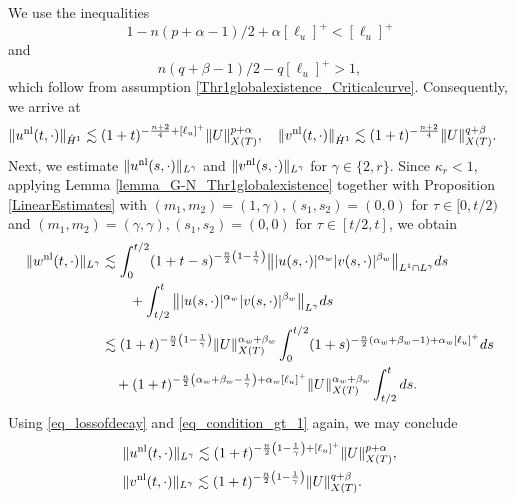\documentclass[11pt,reqno]{amsart}
\newcommand{\tron}[1]{\left(#1\right)}
\begin{document}
	We use the inequalities
	\begin{equation}\label{eq_lossofdecay}
		1-n(p+\alpha-1)/2+\alpha[\ell_u]^+<[\ell_u]^+
	\end{equation}
	and 
	\begin{equation}\label{eq_condition_gt_1}
		n(q+\beta-1)/2-q[\ell_u]^+>1,
	\end{equation}
	which follow from assumption \eqref{Thr1globalexistence_Criticalcurve}. Consequently, we arrive at
	\begin{equation}\label{eq_H1_Thr1}
		\begin{aligned}
			&\|u^{\rm nl}(t,\cdot)\|_{\dot{H}^1}\lesssim (1+t)^{-\frac{n+2}{4}+[\ell_u]^+}\|U\|^{p+\alpha}_{X(T)},\quad \|v^{\rm nl}(t,\cdot)\|_{\dot{H}^1}\lesssim (1+t)^{-\frac{n+2}{4}}\|U\|^{q+\beta}_{X(T)}.
		\end{aligned}
	\end{equation}
	Next, we estimate $\|u^{\rm nl}(s,\cdot)\|_{L^{\gamma}}$ and  $\|v^{\rm nl}(s,\cdot)\|_{L^{\gamma}}$ for $\gamma\in\{2,r\}$. Since $\kappa_{r}<1$, applying Lemma \ref{lemma_G-N_Thr1globalexistence} together with Proposition \ref{LinearEstimates} with $(m_1,m_2) = (1,\gamma), (s_1, s_2) = (0,0)$ for $\tau \in [0, t/2)$ and $(m_1,m_2)=(\gamma,\gamma), (s_1, s_2) = (0,0)$ for $\tau\in[t/2,t]$, we obtain
	\begin{align*}
		\|w^{\rm nl}(t,\cdot)\|_{L^{\gamma}} &\lesssim \int_0^{t/2} (1+t-s)^{-\frac{n}{2}\tron{1-\frac{1}{\gamma}}} \big\||u(s,\cdot)|^{\alpha_w}|v(s,\cdot)|^{\beta_w}\big\|_{L^1\cap L^{\gamma}} ds\\
		&\qquad+\int_{t/2}^t \big\||u(s,\cdot)|^{\alpha_w}|v(s,\cdot)|^{\beta_w}\big\|_{L^{\gamma}} ds\\
		&\lesssim (1+t)^{-\frac{n}{2}\tron{1-\frac{1}{\gamma}}} \|U\|_{X(T)}^{\alpha_w+\beta_w} \int_0^{t/2}(1+s)^{-\frac{n}{2}\tron{\alpha_w+\beta_w-1}+\alpha_w[\ell_u]^+}ds\\
		&\quad+ (1+t)^{-\frac{n}{2}\tron{\alpha_w+\beta_w-\frac{1}{\gamma}}+\alpha_w[\ell_u]^+} \|U\|_{X(T)}^{\alpha_w+\beta_w}\int_{t/2}^tds.
	\end{align*}
	Using \eqref{eq_lossofdecay} and \eqref{eq_condition_gt_1} again, we may conclude
	\begin{equation}\label{eq_Lk_Thr1}
		\begin{aligned}
			&\|u^{\rm nl}(t,\cdot)\|_{L^{\gamma}}\lesssim (1+t)^{-\frac{n}{2}\tron{1-\frac{1}{\gamma}}+[\ell_u]^+}\|U\|^{p+\alpha}_{X(T)},\\
			&\|v^{\rm nl}(t,\cdot)\|_{L^{\gamma}}\lesssim (1+t)^{-\frac{n}{2}\tron{1-\frac{1}{\gamma}}}\|U\|^{q+\beta}_{X(T)}.
		\end{aligned}
	\end{equation}
\end{document}
